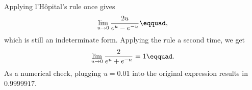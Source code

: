Applying l'H\^{o}pital's rule once gives
\begin{equation*}
  \lim_{u\rightarrow 0} \frac{2u}{e^u-e^{-u}}\eqquad,
\end{equation*}
which is still an indeterminate form. Applying the rule a second time, we get
\begin{equation*}
  \lim_{u\rightarrow 0} \frac{2}{e^u+e^{-u}} = 1\eqquad.
\end{equation*}
As a numerical check, plugging $u=0.01$ into the original expression results
in $0.9999917$.
